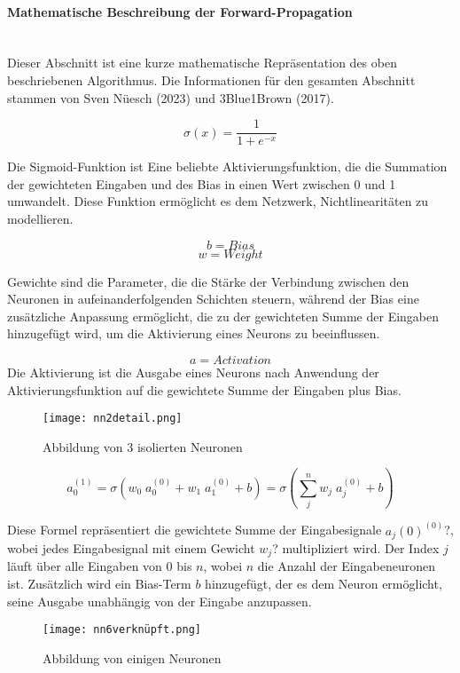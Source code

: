 \paragraph{Mathematische Beschreibung der Forward-Propagation}
\label{sec:forward_propagation_math}
\mbox{}\\\noindent Dieser Abschnitt ist eine kurze mathematische Repräsentation des oben beschriebenen Algorithmus. Die Informationen für den gesamten Abschnitt stammen von Sven Nüesch (2023) und 3Blue1Brown (2017).

\[\sigma(x)=\frac{1}{1+e^{-x}}\]

\noindent Die Sigmoid-Funktion ist Eine beliebte Aktivierungsfunktion, die die Summation der gewichteten Eingaben und des Bias in einen Wert zwischen 0 und 1 umwandelt. Diese Funktion ermöglicht es dem Netzwerk, Nichtlinearitäten zu modellieren.

\[b=Bias\]
\[w=Weight\]

\noindent Gewichte sind die Parameter, die die Stärke der Verbindung zwischen den Neuronen in aufeinanderfolgenden Schichten steuern, während der Bias eine zusätzliche Anpassung ermöglicht, die zu der gewichteten Summe der Eingaben hinzugefügt wird, um die Aktivierung eines Neurons zu beeinflussen.

\[a=Activation\]
Die Aktivierung ist die Ausgabe eines Neurons nach Anwendung der Aktivierungsfunktion auf die gewichtete Summe der Eingaben plus Bias.

\begin{figure}[H]
	\centering
		\texttt{[image: nn2detail.png]}
	\label{fig:nn2detail}
	\caption{Abbildung von 3 isolierten Neuronen}
\end{figure}

\[a_{0}^{(1)} = \sigma(w_{0}\; a_{0}^{(0)} + w_{1}\; a_{1}^{(0)} + b) = \sigma(\sum_{j}^{n} w_{j}\;a_{j} ^{(0)} + b)\]

\noindent Diese Formel repräsentiert die gewichtete Summe der Eingabesignale $a_j(0)^(0)$?, wobei jedes Eingabesignal mit einem Gewicht $w_j$? multipliziert wird. Der Index $j$ läuft über alle Eingaben von 0 bis $n$, wobei $n$ die Anzahl der Eingabeneuronen ist. Zusätzlich wird ein Bias-Term $b$ hinzugefügt, der es dem Neuron ermöglicht, seine Ausgabe unabhängig von der Eingabe anzupassen.

\begin{figure}[H]
	\centering
		\texttt{[image: nn6verknüpft.png]}
	\label{fig:nn6verknüpft}
	\caption{Abbildung von einigen Neuronen}
\end{figure}

